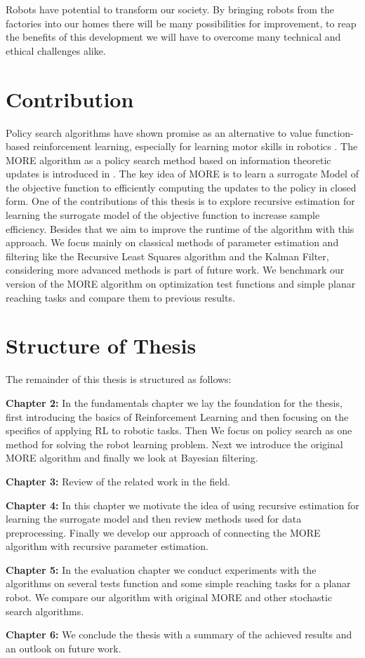Robots have potential to transform our society. By
bringing robots from the factories into our homes there will be many
possibilities for improvement, to reap the benefits of this
development we will have to overcome many technical and
ethical challenges alike.



\section{Contribution}
Policy search algorithms have shown promise as an alternative
to value function-based reinforcement learning, especially for learning motor
skills in robotics \citet{deisenroth2013survey}.
The MORE algorithm as a policy search method based on
information theoretic updates is introduced in \citet{abdolmaleki2015model}.
The key idea of MORE is to learn a surrogate Model of
the objective function to efficiently computing the updates to
the policy in closed form. One of
the contributions of this thesis is to explore recursive estimation 
for learning the surrogate model of the objective function to increase
sample efficiency. Besides that we aim to improve the  runtime of
the algorithm with this approach.
We focus mainly on classical methods of parameter estimation and filtering
like the Recursive Least Squares algorithm and the Kalman Filter,
considering more advanced methods is part of future work.
We benchmark our version of the MORE algorithm on optimization test functions and
simple planar reaching tasks and compare
them to previous results.

\section{Structure of Thesis}
The remainder of this thesis is structured as follows:

\textbf{Chapter 2:} In the fundamentals chapter we lay the foundation for
the thesis, first introducing the basics of Reinforcement Learning and
then focusing on the specifics of applying RL to robotic tasks.
Then We focus on policy search as one method for
solving the robot learning problem.
Next we introduce the original MORE algorithm and finally
we look at Bayesian filtering.

\textbf{Chapter 3:} Review of the related work in the field.

\textbf{Chapter 4:} In this chapter we motivate the idea of
using recursive estimation for learning the surrogate model
and then review methods used for data preprocessing.
Finally we develop our approach of  connecting
the MORE algorithm with recursive parameter estimation. 

\textbf{Chapter 5:} In the evaluation chapter we conduct experiments
with the algorithms on several tests function and some simple reaching tasks
for a planar robot. We compare our algorithm with original MORE and
other stochastic search algorithms.

\textbf{Chapter 6:} We conclude the thesis with a summary of
the achieved results and an outlook on future work.